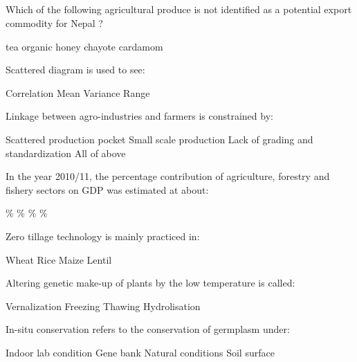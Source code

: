 
\subsection*{}

\begin{questions}

\question Which of the following agricultural produce is not identified as a potential export commodity for Nepal ?
  \begin{choices}
  \choice tea
  \choice organic honey
  \choice chayote
  \choice cardamom
  \end{choices}

\question Scattered diagram is used to see:
  \begin{choices}
  \choice Correlation
  \choice Mean
  \choice Variance
  \choice Range
  \end{choices}

\question Linkage between agro-industries and farmers is constrained by:
  \begin{choices}
  \choice Scattered production pocket
  \choice Small scale production
  \choice Lack of grading and standardization
  \choice All of above
  \end{choices}

\question In the year 2010/11, the percentage contribution of agriculture, forestry and fishery sectors on GDP was estimated at about:
  \begin{choices}
  \%
  \%
  \%
  \%
  \end{choices}

\question Zero tillage technology is mainly practiced in:
  \begin{choices}
  \choice Wheat
  \choice Rice
  \choice Maize
  \choice Lentil
  \end{choices}

\question Altering genetic make-up of plants by the low temperature is called:
  \begin{choices}
  \choice Vernalization
  \choice Freezing
  \choice Thawing
  \choice Hydrolisation
  \end{choices}

\question In-situ conservation refers to the conservation of germplasm under:
  \begin{choices}
  \choice Indoor lab condition
  \choice Gene bank
  \choice Natural conditions
  \choice Soil surface
  \end{choices}


\end{questions}
